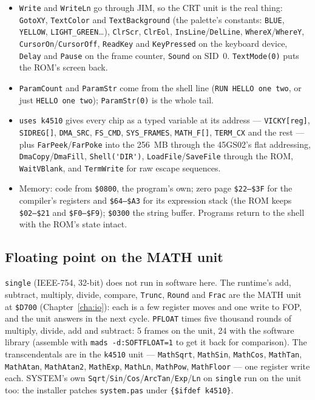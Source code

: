 \begin{itemize}
\item \verb|Write| and \verb|WriteLn| go through JIM, so the CRT unit is
  the real thing: \verb|GotoXY|, \verb|TextColor| and
  \verb|TextBackground| (the palette's constants: \verb|BLUE|,
  \verb|YELLOW|, \verb|LIGHT_GREEN|\ldots), \verb|ClrScr|, \verb|ClrEol|,
  \verb|InsLine|/\verb|DelLine|, \verb|WhereX|/\verb|WhereY|,
  \verb|CursorOn|/\verb|CursorOff|, \verb|ReadKey| and \verb|KeyPressed|
  on the keyboard device, \verb|Delay| and \verb|Pause| on the frame
  counter, \verb|Sound| on SID~0. \verb|TextMode(0)| puts the ROM's
  screen back.
\item \verb|ParamCount| and \verb|ParamStr| come from the shell
  line (\texttt{RUN HELLO one two}, or just \texttt{HELLO one two});
  \verb|ParamStr(0)| is the whole tail.
\item \verb|uses k4510| gives every chip as a typed variable at its
  address --- \verb|VICKY[reg]|, \verb|SIDREG[]|, \verb|DMA_SRC|,
  \verb|FS_CMD|, \verb|SYS_FRAMES|, \verb|MATH_F[]|, \verb|TERM_CX|
  and the rest --- plus \verb|FarPeek|/\verb|FarPoke| into the 256~MB
  through the 45GS02's flat addressing, \verb|DmaCopy|/\verb|DmaFill|,
  \verb|Shell('DIR')|, \verb|LoadFile|/\verb|SaveFile| through the ROM,
  \verb|WaitVBlank|, and \verb|TermWrite| for raw escape sequences.
\item Memory: code from \texttt{\$0800}, the program's own; zero page
  \texttt{\$22--\$3F} for the compiler's registers and
  \texttt{\$64--\$A3} for its expression stack (the ROM keeps
  \texttt{\$02--\$21} and \texttt{\$F0--\$F9}); \texttt{\$0300} the string
  buffer. Programs return to the shell with the ROM's state intact.
\end{itemize}

\subsection*{Floating point on the MATH unit}
\texttt{single} (IEEE-754, 32-bit) does not run in software here. The
runtime's add, subtract, multiply, divide, compare, \verb|Trunc|,
\verb|Round| and \verb|Frac| are the MATH unit at \texttt{\$D700}
(Chapter~\ref{cha:io}): each is a few register moves and one write to
FOP, and the unit answers in the next cycle. \texttt{PFLOAT} times five
thousand rounds of multiply, divide, add and subtract: 5 frames on the
unit, 24 with the software library (assemble with
\verb|mads -d:SOFTFLOAT=1| to get it back for comparison). The
transcendentals are in the \texttt{k4510} unit --- \verb|MathSqrt|,
\verb|MathSin|, \verb|MathCos|, \verb|MathTan|, \verb|MathAtan|,
\verb|MathAtan2|, \verb|MathExp|, \verb|MathLn|, \verb|MathPow|,
\verb|MathFloor| --- one register write each. SYSTEM's own
\verb|Sqrt|/\verb|Sin|/\verb|Cos|/\verb|ArcTan|/\verb|Exp|/\verb|Ln| on
\texttt{single} run on the unit too: the installer patches
\texttt{system.pas} under \verb|{$ifdef k4510}|.

